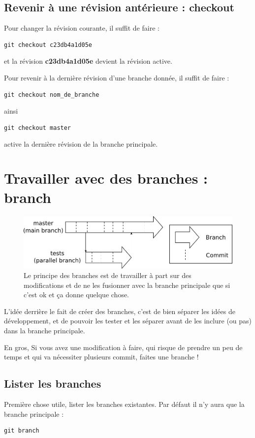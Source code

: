 \documentclass[a4paper,twoside]{article}
\begin{document}
\subsection{Revenir à une révision antérieure : checkout}\label{sec:revenir_en_arriere}
Pour changer la révision courante, il suffit de faire : 
\begin{verbatim}
git checkout c23db4a1d05e
\end{verbatim}
et la révision \textbf{c23db4a1d05e} devient la révision active. 

Pour revenir à la dernière révision d'une branche donnée, il suffit de faire :
\begin{verbatim}
git checkout nom_de_branche
\end{verbatim}
ainsi
\begin{verbatim}
git checkout master
\end{verbatim}
active la dernière révision de la branche principale.


\section{Travailler avec des branches : branch}
\begin{figure}[htb]
\centering
\includegraphics[width=0.75\linewidth]{figure/branchs.pdf}
\caption{Le principe des branches est de travailler à part sur des modifications et de ne les fusionner avec la branche principale que si c'est ok et ça donne quelque chose.}
\end{figure}

L'idée derrière le fait de créer des branches, c'est de bien séparer les idées de développement, et de pouvoir les tester et les séparer avant de les inclure (ou pas) dans la branche principale. 

\begin{important}
En gros, Si vous avez une modification à faire, qui risque de prendre un peu de temps et qui va nécessiter plusieurs commit, faites une branche !
\end{important}


\subsection{Lister les branches}
Première chose utile, lister les branches existantes. Par défaut il n'y aura que la branche principale : 
\begin{verbatim}
git branch
\end{verbatim}
\end{document}
